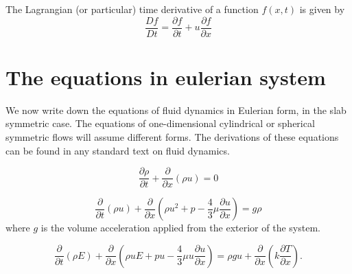 \begin{Definition}\label{chap1:def1.1}
The Lagrangian (or particular) time derivative of a function $f(x,t)$
is given by
\begin{equation*}
\frac{Df}{Dt} = \frac{\partial f}{\partial t} + u \frac{\partial
  f}{\partial x} \tag{1.7}\label{eq1.7}
\end{equation*}
\end{Definition}

\section{The equations in eulerian system}\label{chap1:sec1.4}

We now write down the equations of fluid dynamics in Eulerian form, in
the slab symmetric case. The equations of one-dimensional cylindrical
or spherical symmetric flows will assume different forms. The
derivations of these equations can be found in any standard text on
fluid dynamics.

\medskip
{}
\begin{equation*}
\frac{\partial \rho}{\partial t} + \frac{\partial}{\partial x}
(\rho u) = 0 \tag{1.8}\label{eq1.8}
\end{equation*}

\medskip
{}
\begin{equation*}
\frac{\partial}{\partial t} (\rho u)+ \frac{\partial}{\partial x}
\left(\rho u^2 + p - \frac{4}{3} \mu \frac{\partial u}{\partial x}\right) = g
\rho \tag{1.9}\label{eq1.9}
 \end{equation*}
where $g$ is the volume acceleration applied from the exterior of the
system.

\medskip
{}
\begin{equation*}
\frac{\partial}{\partial t} (\rho E) + \frac{\partial }{\partial x}
\left(\rho u E + pu - \frac{4}{3} \mu u \frac{\partial u}{\partial x}\right)
= \rho gu + \frac{\partial }{\partial x} \left(k \frac{\partial
  T}{\partial x}\right). \tag{1.10}\label{eq1.10}
\end{equation*}\pageoriginale

